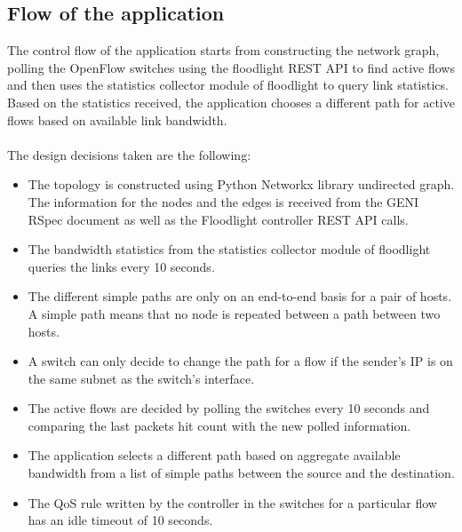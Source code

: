 \documentclass[paper=a4, fontsize=11pt]{scrartcl}	%
\numberwithin{equation}{section}		%
\numberwithin{figure}{section}			%
\numberwithin{table}{section}				%
\begin{document}
\subsection{Flow of the application}
The control flow of the application starts from constructing the network graph, polling the OpenFlow switches using the floodlight REST API to find active flows and then uses the statistics collector module of floodlight to query link statistics. Based on the statistics received, the application chooses a different path for active flows based on available link bandwidth.
\\
\\
The design decisions taken are the following:
\begin{itemize}
\item The topology is constructed using Python Networkx library undirected graph. The information for the nodes and the edges is received from the GENI RSpec document as well as the Floodlight controller REST API calls.
\item The bandwidth statistics from the statistics collector module of floodlight queries the links every 10 seconds.
\item The different simple paths are only on an end-to-end basis for a pair of hosts. A simple path means that no node is repeated between a path between two hosts.
\item A switch can only decide to change the path for a flow if the sender's IP is on the same subnet as the switch's interface.
\item The active flows are decided by polling the switches every 10 seconds and comparing the last packets hit count with the new polled information.
\item The application selects a different path based on aggregate available bandwidth from a list of simple paths between the source and the destination.
\item The QoS rule written by the controller in the switches for a particular flow has an idle timeout of 10 seconds.

\end{itemize}
\end{document}

